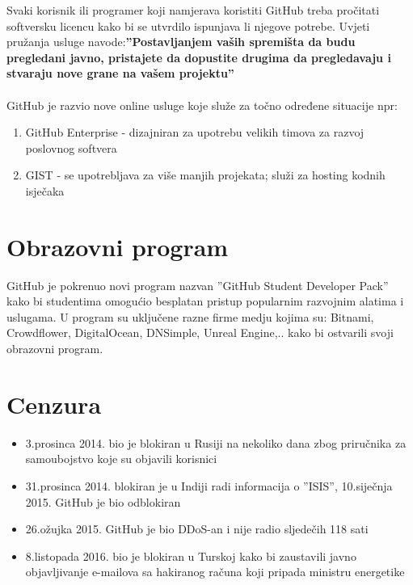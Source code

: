 \documentclass{article}
\begin{document}
		Svaki korisnik ili programer koji namjerava koristiti GitHub treba pročitati softversku licencu kako bi se utvrdilo ispunjava li
		njegove potrebe. Uvjeti pružanja usluge navode:\textbf{''Postavljanjem vaših spremišta da budu pregledani javno, pristajete da dopustite drugima da pregledavaju i stvaraju nove grane
		na vašem projektu''}
		\\
		\\
		GitHub je razvio nove online usluge koje služe za točno određene situacije npr:
		\begin{enumerate}
			\item GitHub Enterprise - dizajniran za upotrebu velikih timova za razvoj poslovnog softvera
			\item GIST - se upotrebljava za više manjih projekata; služi za hosting kodnih isječaka
		\end{enumerate}

	\section{\textbf {Obrazovni program}}
		GitHub je pokrenuo novi program nazvan ''GitHub Student Developer Pack'' kako bi studentima omogućio besplatan pristup popularnim razvojnim alatima i uslugama.
		U program su uključene razne firme medju kojima su: Bitnami, Crowdflower, DigitalOcean, DNSimple, Unreal Engine,.. kako bi ostvarili svoji obrazovni program.
		\\

	\section{\textbf {Cenzura}}
	\begin{itemize}
		\item 3.prosinca 2014. bio je blokiran u Rusiji na nekoliko dana zbog priručnika za samoubojstvo koje su objavili korisnici
		\item 31.prosinca 2014. blokiran je u Indiji radi informacija o ''ISIS'', 10.siječnja 2015. GitHub je bio odblokiran
		\item 26.ožujka 2015. GitHub je bio DDoS-an i nije radio sljedečih 118 sati
		\item 8.listopada 2016. bio je blokiran u Turskoj kako bi zaustavili javno objavljivanje e-mailova sa hakiranog računa koji pripada ministru energetike\\
	\end{itemize}
\end{document}
